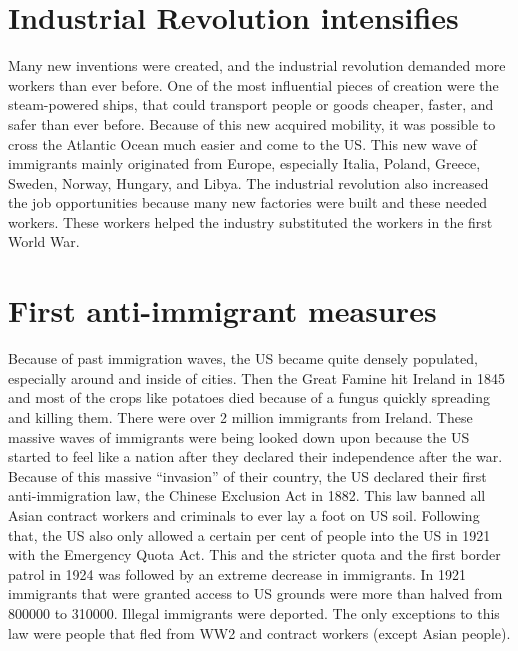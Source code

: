 \documentclass[12pt]{article}
\begin{document}
	\section{Industrial Revolution intensifies}
	Many new inventions were created, and the industrial revolution demanded more workers than ever before. One of the most influential pieces of creation were the steam-powered ships, that could transport people or goods cheaper, faster, and safer than ever before. Because of this new acquired mobility, it was possible to cross the Atlantic Ocean much easier and come to the US. This new wave of immigrants mainly originated from Europe, especially Italia, Poland, Greece, Sweden, Norway, Hungary, and Libya. The industrial revolution also increased the job opportunities because many new factories were built and these needed workers. These workers helped the industry substituted the workers in the first World War.
	
	\section{First anti-immigrant measures}
	Because of past immigration waves, the US became quite densely populated, especially around and inside of cities. Then the Great Famine hit Ireland in 1845 and most of the crops like potatoes died because of a fungus quickly spreading and killing them. There were over 2 million immigrants from Ireland. These massive waves of immigrants were being looked down upon because the US started to feel like a nation after they declared their independence after the war. Because of this massive “invasion” of their country, the US declared their first anti-immigration law, the Chinese Exclusion Act in 1882. This law banned all Asian contract workers and criminals to ever lay a foot on US soil. Following that, the US also only allowed a certain per cent of people into the US in 1921 with the Emergency Quota Act. This and the stricter quota and the first border patrol in 1924 was followed by an extreme decrease in immigrants. In 1921 immigrants that were granted access to US grounds were more than halved from 800000 to 310000. Illegal immigrants were deported. The only exceptions to this law were people that fled from WW2 and contract workers (except Asian people). 
	\newpage
	
\end{document}
